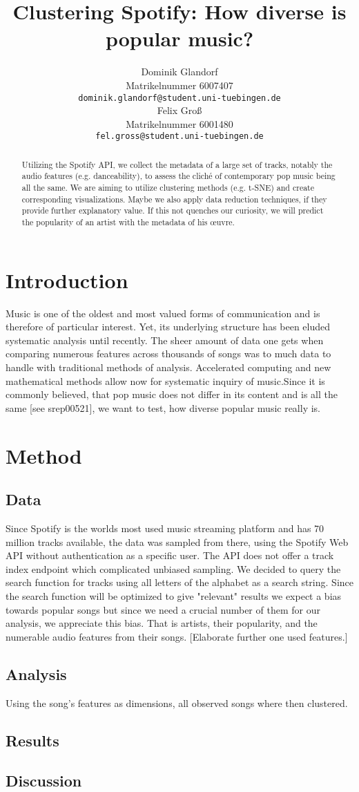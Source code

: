 \documentclass{article}
\title{Clustering Spotify: How diverse is popular music?}
\author{%
  Dominik Glandorf\\
  Matrikelnummer 6007407\\
  \texttt{dominik.glandorf@student.uni-tuebingen.de} \\
  \And
  Felix Groß\\
  Matrikelnummer 6001480\\
  \texttt{fel.gross@student.uni-tuebingen.de} \\
}
\begin{document}
\maketitle

\begin{abstract}
{Utilizing the Spotify API, we collect the metadata of a large set of tracks, notably the audio features (e.g. danceability), to assess the cliché of contemporary pop music being all the same.  
  We are aiming to utilize clustering methods (e.g. t-SNE) and create corresponding visualizations. Maybe we also apply data reduction techniques, if they provide further explanatory value. If this not quenches our curiosity, we will predict the popularity of an artist with the metadata of his œuvre.}
\end{abstract}

\section{Introduction}

Music is one of the oldest and most valued forms of communication and is therefore of particular interest. Yet, its underlying structure has been eluded systematic analysis until recently. The sheer amount of data one gets when comparing numerous features across thousands of songs was to much data to handle with traditional methods of analysis. Accelerated computing and new mathematical methods allow now for systematic inquiry of music.\newline Since it is commonly believed, that pop music does not differ in its content and is all the same [see srep00521], we want  to test, how diverse popular music really is. 

\section{Method}

\subsection{Data}
Since Spotify is the worlds most used music streaming platform and has 70 million tracks available, the data was sampled from there, using the Spotify Web API without authentication as a specific user. The API does not offer a track index endpoint which complicated unbiased sampling. We decided to query the search function for tracks using all letters of the alphabet as a search string. Since the search function will be optimized to give "relevant" results we expect a bias towards popular songs but since we need a crucial number of them for our analysis, we appreciate this bias. That is artists, their popularity, and the numerable audio features from their songs. 
[Elaborate further one used features.]

\subsection{Analysis}
Using the song's features as dimensions, all observed songs where then clustered. 

\subsection{Results}

\subsection{Discussion}
\end{document}
